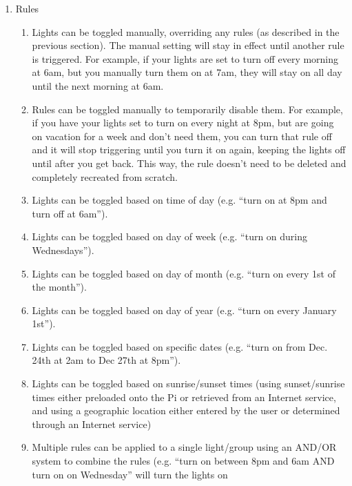 \begin{enumerate}
    \item Rules
        \begin{enumerate}
            \item Lights can be toggled manually, overriding any rules (as
                described in the previous section). The manual setting will
                stay in effect until another rule is triggered. For example, if
                your lights are set to turn off every morning at 6am, but you
                manually turn them on at 7am, they will stay on all day until
                the next morning at 6am.
            \item Rules can be toggled manually to temporarily disable them.
                For example, if you have your lights set to turn on every night
                at 8pm, but are going on vacation for a week and don't need
                them, you can turn that rule off and it will stop triggering
                until you turn it on again, keeping the lights off until after
                you get back. This way, the rule doesn't need to be deleted and
                completely recreated from scratch.
            \item Lights can be toggled based on time of day (e.g. ``turn on at
                8pm and turn off at 6am'').
            \item Lights can be toggled based on day of week (e.g. ``turn on
                during Wednesdays'').
            \item Lights can be toggled based on day of month (e.g. ``turn on
                every 1st of the month'').
            \item Lights can be toggled based on day of year (e.g. ``turn on
                every January 1st'').
            \item Lights can be toggled based on specific dates (e.g. ``turn on
                from Dec. 24th at 2am to Dec 27th at 8pm'').
            \item Lights can be toggled based on sunrise/sunset times (using
                sunset/sunrise times either preloaded onto the Pi or retrieved
                from an Internet service, and using a geographic location
                either entered by the user or determined through an Internet
                service)
            \item Multiple rules can be applied to a single light/group using
                an AND/OR system to combine the rules (e.g. ``turn on between
                8pm and 6am AND turn on on Wednesday'' will turn the lights on

\end{enumerate}
\end{enumerate}
